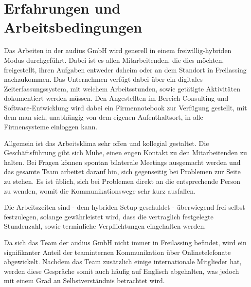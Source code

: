 
\section{Erfahrungen und Arbeitsbedingungen}
\label{sec:arbeitsbedingungen}

Das Arbeiten in der audius GmbH wird generell in einem freiwillig-hybriden Modus durchgeführt. Dabei ist es allen Mitarbeitenden, die dies möchten, freigestellt, ihren Aufgaben entweder daheim oder an dem Standort in Freilassing nachzukommen. Das Unternehmen verfügt dabei über ein digitales Zeiterfassungssystem, mit welchem Arbeitsstunden, sowie getätigte Aktivitäten dokumentiert werden müssen. Den Angestellten im Bereich Consulting und Software-Entwicklung wird dabei ein Firmennotebook zur Verfügung gestellt, mit dem man sich, unabhängig von dem eigenen Aufenthaltsort, in alle Firmensysteme einloggen kann.

Allgemein ist das Arbeitsklima sehr offen und kollegial gestaltet. Die Geschäftsführung gibt sich Mühe, einen engen Kontakt zu den Mitarbeitenden zu halten. Bei Fragen können spontan bilaterale Meetings ausgemacht werden und das gesamte Team arbeitet darauf hin, sich gegenseitig bei Problemen zur Seite zu stehen. Es ist üblich, sich bei Problemen direkt an die entsprechende Person zu wenden, womit die Kommunikationswege sehr kurz ausfallen.

Die Arbeitszeiten sind - dem hybriden Setup geschuldet - überwiegend frei selbst festzulegen, solange gewährleistet wird, dass die vertraglich festgelegte Stundenzahl, sowie terminliche Verpflichtungen eingehalten werden. 

Da sich das Team der audius GmbH nicht immer in Freilassing befindet, wird ein signifikanter Anteil der teaminternen Kommunikation über Onlinetelefonate abgewickelt. Nachdem das Team zusätzlich einige internationale Mitglieder hat, werden diese Gespräche somit auch häufig auf Englisch abgehalten, was jedoch mit einem Grad an Selbstverständnis betrachtet wird.
